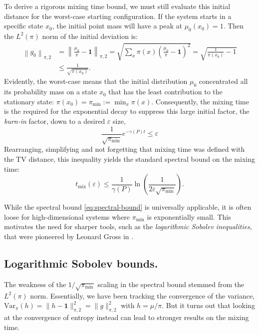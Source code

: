 To derive a rigorous mixing time bound, we must still evaluate this initial distance for the worst-case starting configuration. If the system starts in a specific state $x_0$, the initial point mass will have a peak at $\mu_0(x_0) = 1$. Then the $L^2(\pi)$ norm of the initial deviation is:
\begin{equation}
    \begin{split}
            \left\|g_0\right\|_{\pi, 2} &= \left\|\frac{\mu_0}{\pi} - \mathbf{1}\right\|_{\pi, 2} = \sqrt{\sum_x \pi(x) \left(\frac{\mu_0}{\pi} - \mathbf{1}\right)^2} = \sqrt{\frac{1}{\pi(x_0)} -1} \\
            &\leq \frac{1}{\sqrt{\pi(x_0)}}.
    \end{split}
\end{equation}
Evidently, the worst-case means that the initial distribution $\mu_0$ concentrated all its probability mass on a state $x_0$ that has the least contribution to the stationary state: $\pi(x_0) = \pi_{\min} := \min_x \pi(x)$. Consequently, the mixing time is the required for the exponential decay to suppress this large initial factor, the \textit{burn-in} factor, down to a desired $\varepsilon$ size,
\begin{equation}
    \frac{1}{\sqrt{\pi_{\min}}} e^{-\gamma(P) t} \leq \varepsilon
\end{equation}
Rearranging, simplifying and not forgetting that mixing time was defined with the TV distance, this inequality yields the standard spectral bound on the mixing time:
\begin{equation}
\label{eq:spectral-bound}
t_\text{mix}(\varepsilon) \leq \frac{1}{\gamma(P)} \ln \left(\frac{1}{2\varepsilon \sqrt{\pi_{\min}}}\right).
\end{equation}

While the spectral bound \eqref{eq:spectral-bound} is universally applicable, it is often loose for high-dimensional systems where $\pi_{\min}$ is exponentially small. This motivates the need for sharper tools, such as the \textit{logarithmic Sobolev inequalities}, that were pioneered by Leonard Gross in \cite{gross1975logarithmic}.

\smallskip
\subsection{Logarithmic Sobolev bounds.} The weakness of the $1 / \sqrt{\pi_{\min}}$ scaling in the spectral bound stemmed from the $L^2(\pi)$ norm. Essentially, we have been tracking the convergence of the variance, $\mathrm{Var}_\pi(h) = \|h - \mathbf{1}\|_{\pi, 2}^2 = \|g\|_{\pi, 2}^2$ with $h = \mu / \pi$. But it turns out that looking at the convergence of entropy instead can lead to stronger results on the mixing time. 

